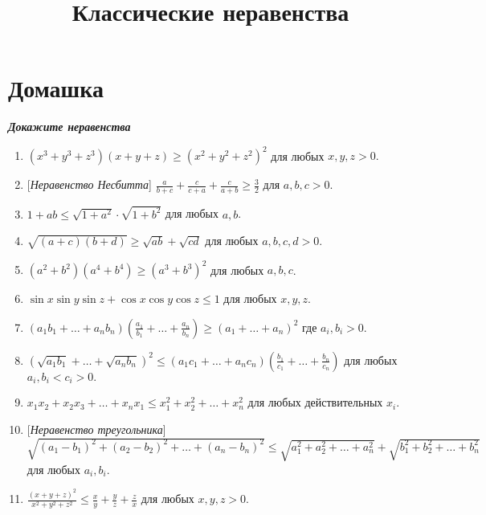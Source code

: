 \documentclass[a4paper,12pt,leqno]{article}
\title{\textbf{Классические неравенства}}
\date{}
\begin{document}
	\parskip=0mm
	\linespread{1}
	\maketitle
	
	
	\newcommand{\z}{\addtocounter{zadacha}{1}%
		\boxed{\arabic{zadacha}} }
	\section*{Домашка}
	\textbf{\textit{Докажите неравенства}}
	
	\newcommand{\ner}[1]{\item[\z] #1}
	
	\begin{enumerate}
		\ner{$(x^3+y^3+z^3)(x+y+z) \geqslant (x^2+y^2+z^2)^2$ для любых $x, y, z > 0.$}
		
		\ner{[\textit{Неравенство Несбитта}] $\displaystyle\frac{a}{b+c} + \frac{c}{c+a} + \frac{c}{a+b} \geqslant \frac{3}{2}$ для $a, b, c > 0.$}
		
		\ner{$1+ab \leqslant \sqrt{1+a^2} \cdot \sqrt{1+b^2}$ для любых $a, b$.}
		
		\ner{$\sqrt{(a+c)(b+d)} \geqslant \sqrt{ab} + \sqrt{cd}$ для любых $a, b, c, d > 0$.}
		
		\ner{$(a^2+b^2)(a^4+b^4) \geqslant (a^3+b^3)^2$ для любых $a, b, c$.}
		
		\ner{$\sin x \sin y \sin z + \cos x \cos y \cos z \leqslant 1$ для любых $x, y, z$.}
		
		\ner{$\displaystyle(a_1b_1 + \dots +a_nb_n) \left( \frac{a_1}{b_1} + \dots + \frac{a_n}{b_n} \right) \geqslant (a_1+\dots+a_n)^2 $ где $a_i, b_i > 0$.}
		
		\ner{$\displaystyle(\sqrt{a_1b_1} + \dots + \sqrt{a_nb_n})^2 \leqslant (a_1c_1 + \dots + a_nc_n)\left( \frac{b_1}{c_1} + \dots + \frac{b_n}{c_n}\right) $ для любых $a_i, b_i< c_i > 0.$}
		
		\ner{$x_1x_2 + x_2x_3 + \dots + x_nx_1 \leqslant x_1^2 + x_2^2 + \dots + x_n^2$ для любых действительных $x_i$.}
		
		\ner{[\textit{Неравенство треугольника}] $\sqrt{(a_1 - b_1)^2 + (a_2 - b_2)^2 + \dots + (a_n-b_n)^2} \leqslant \sqrt{a_1^2 + a_2^2 + \dots + a_n^2} + \sqrt{b_1^2 +b_2^2 + \dots + b_n^2}$ для любых $a_i, b_i$.}
		
		\ner{$\displaystyle\frac{(x+y+z)^2}{x^2+y^2+z^2} \leqslant \frac{x}{y} + \frac{y}{z} + \frac{z}{x}$ для любых $x, y, z > 0$.}
		

\end{enumerate}
\end{document}
